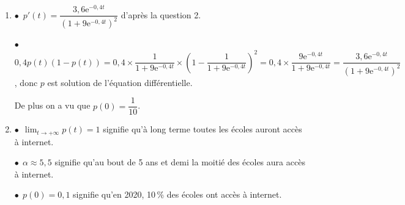 \documentclass[10pt]{article}
\providecommand{\starredbullet}{\ensuremath{\bullet}}
\providecommand{\e}{{\mathrm{e}}}
\begin{document}
\begin{enumerate}
\item 




\starredbullet~$p'(t) = \dfrac{3,6\e^{-0,4t}}{\left(1 + 9\e^{-0,4t} \right)^2}$ d'après la question 2.

\starredbullet~$0,4p(t)(1 - p(t)) = 0,4 \times \dfrac{1}{1 + 9\text{e}^{-0,4t}} \times \left(1 - \dfrac{1}{1 + 9\text{e}^{-0,4t}} \right)^2 = 0,4\times \dfrac{9\text{e}^{-0,4t}}{1 + 9\text{e}^{-0,4t}} = \dfrac{3,6\e^{-0,4t}}{\left(1 + 9\e^{-0,4t} \right)^2}$, donc $p$ est solution de l'équation différentielle.

De plus on a vu que $p(0) = \dfrac{1}{10}$.
\item 








$\bullet~~$$\displaystyle\lim_{t \to + \infty} p(t) = 1$ signifie qu'à long terme toutes les écoles auront accès à internet.

$\bullet~~$$\alpha \approx 5,5$ signifie qu'au bout de 5 ans et demi la moitié des écoles aura accès à internet.

$\bullet~~$$p(0) = 0,1$ signifie qu'en 2020, 10\,\% des écoles ont accès à internet.
\end{enumerate}
\end{document}

